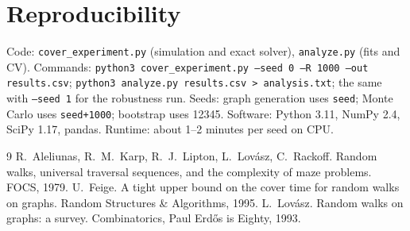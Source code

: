 \documentclass[10pt]{article}
\begin{document}
\section*{Reproducibility}
Code: \texttt{cover\_experiment.py} (simulation and exact solver), \texttt{analyze.py} (fits and CV).
Commands: \texttt{python3 cover\_experiment.py --seed 0 --R 1000 --out results.csv};
\texttt{python3 analyze.py results.csv > analysis.txt}; the same with \texttt{--seed 1} for the robustness run.
Seeds: graph generation uses \texttt{seed}; Monte Carlo uses \texttt{seed+1000}; bootstrap uses 12345.
Software: Python 3.11, NumPy 2.4, SciPy 1.17, pandas. Runtime: about 1--2 minutes per seed on CPU.

\begin{thebibliography}{9}
 R.~Aleliunas, R.~M.~Karp, R.~J.~Lipton, L.~Lov\'asz, C.~Rackoff.
Random walks, universal traversal sequences, and the complexity of maze problems. FOCS, 1979.
 U.~Feige. A tight upper bound on the cover time for random walks on graphs.
Random Structures \& Algorithms, 1995.
 L.~Lov\'asz. Random walks on graphs: a survey. Combinatorics, Paul Erd\H{o}s is Eighty, 1993.
\end{thebibliography}
\end{document}
